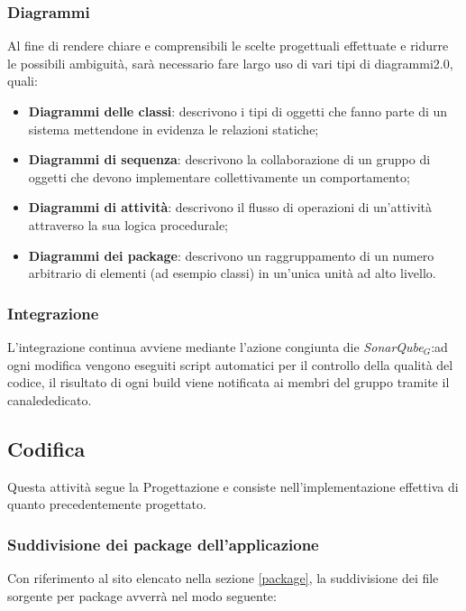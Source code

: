 \subsubsection{Diagrammi}
Al fine di rendere chiare e comprensibili le scelte progettuali effettuate e ridurre le possibili ambiguità, sarà necessario fare largo uso di vari tipi di diagrammi2.0, quali:
\begin{itemize}
	\item \textbf{Diagrammi delle classi}: descrivono i tipi di oggetti che fanno parte di un sistema mettendone in evidenza le relazioni statiche;
	\item \textbf{Diagrammi di sequenza}: descrivono la collaborazione di un gruppo di oggetti che devono implementare collettivamente un comportamento;
	\item \textbf{Diagrammi di attività}: descrivono il flusso di operazioni di un'attività attraverso la sua logica procedurale;
	\item \textbf{Diagrammi dei package}: descrivono un raggruppamento di un numero arbitrario di elementi (ad esempio classi) in un'unica unità ad alto livello.
\end{itemize}
\subsubsection{Integrazione}
L'integrazione continua avviene mediante l'azione congiunta die \textit{SonarQube$_{G}$}:ad ogni modifica vengono eseguiti script automatici per il controllo della qualità del codice, il risultato di ogni build viene notificata ai membri del gruppo tramite il canalededicato.

\subsection{Codifica}
Questa attività segue la Progettazione e consiste nell'implementazione effettiva di quanto precedentemente progettato.
\subsubsection{Suddivisione dei package dell'applicazione}
Con riferimento al sito elencato nella sezione \ref{package}, la suddivisione dei file sorgente per package avverrà nel modo seguente:

